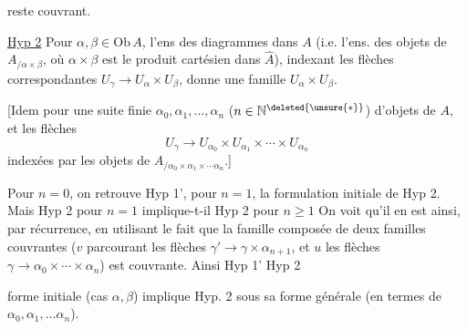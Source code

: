
reste couvrant.

\uline{Hyp 2} Pour $\alpha,\beta\in\mathrm{Ob}\,A$, l'ens des  diagrammes
\diagram{\begin{tikzcd}[ampersand replacement=\&,column sep=small,row sep=small]\&\alpha\\\gamma\arrow[ur]\arrow[dr]\&\\\&\beta\end{tikzcd}}
dans $A$ (i.e. l'ens. des objets de $A_{/\alpha\times\beta}$, où $\alpha\times\beta$ est le produit cartésien dans $\widehat A$), indexant les flèches correspondantes $U_\gamma\longrightarrow U_\alpha\times U_\beta$, donne une famille  $U_\alpha\times U_\beta$.

[Idem pour une suite finie  $\alpha_0,\alpha_1,\ldots,\alpha_n$ ($n\in\mathbb N^{\deleted{\unsure{*}}}$) d'objets de $A$, et les  flèches
\[U_\gamma\longrightarrow U_{\alpha_0}\times U_{\alpha_1}\times\cdots\times U_{\alpha_n}\]
indexées par les objets de $A_{/\alpha_0\times\alpha_1\times\cdots\alpha_n}$.]

Pour $n=0$, on retrouve Hyp 1', pour $n=1$, la formulation initiale de Hyp 2. Mais Hyp 2 pour $n=1$ implique-t-il Hyp 2 pour  $n\geq1$ On voit qu'il en est ainsi, par récurrence, en utilisant le fait que la famille composée de deux familles couvrantes
($v$ parcourant les flèches $\gamma'\longrightarrow\gamma\times\alpha_{n+1}$, et $u$ les flèches  $\gamma\longrightarrow\alpha_0\times\cdots\times\alpha_n$) est couvrante. Ainsi Hyp 1'  \inserted{$+$} Hyp 2


forme initiale (cas $\alpha,\beta$) implique Hyp. 2 sous sa forme générale (en termes de $\alpha_0,\alpha_1,\ldots\alpha_n$).

